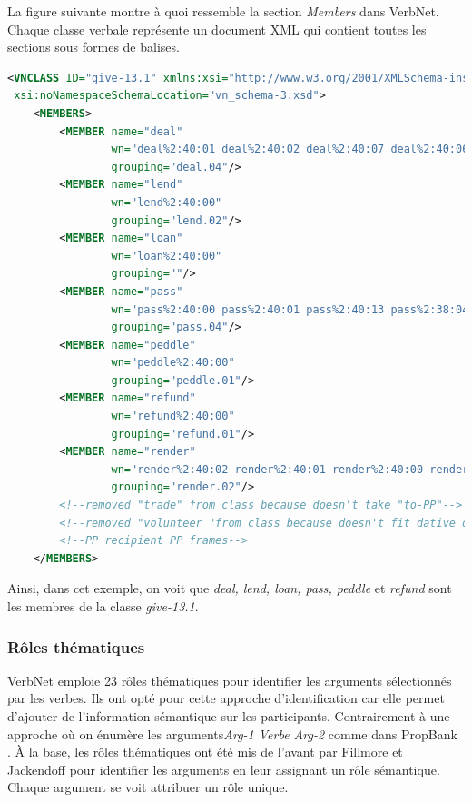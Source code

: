 La figure suivante montre à quoi ressemble la section \emph{Members} dans VerbNet. Chaque classe verbale représente un document XML qui contient toutes les sections sous formes de balises.

\begin{lstlisting}[language=XML, caption = Les membres d'une classe]
<VNCLASS ID="give-13.1" xmlns:xsi="http://www.w3.org/2001/XMLSchema-instance"
 xsi:noNamespaceSchemaLocation="vn_schema-3.xsd">
    <MEMBERS>
        <MEMBER name="deal" 
				wn="deal%2:40:01 deal%2:40:02 deal%2:40:07 deal%2:40:06" 
				grouping="deal.04"/>
        <MEMBER name="lend" 
				wn="lend%2:40:00" 
				grouping="lend.02"/>
        <MEMBER name="loan" 
				wn="loan%2:40:00" 
				grouping=""/>
        <MEMBER name="pass" 
				wn="pass%2:40:00 pass%2:40:01 pass%2:40:13 pass%2:38:04" 
				grouping="pass.04"/>
        <MEMBER name="peddle" 
				wn="peddle%2:40:00" 
				grouping="peddle.01"/>
        <MEMBER name="refund" 
				wn="refund%2:40:00" 
				grouping="refund.01"/>
        <MEMBER name="render" 
				wn="render%2:40:02 render%2:40:01 render%2:40:00 render%2:40:03" 
				grouping="render.02"/>
        <!--removed "trade" from class because doesn't take "to-PP"-->
        <!--removed "volunteer "from class because doesn't fit dative or-->
        <!--PP recipient PP frames-->
    </MEMBERS>
\end{lstlisting}

Ainsi, dans cet exemple, on voit que \emph{deal, lend, loan, pass, peddle} et \emph{refund} sont les membres de la classe \emph{give-13.1}.

\subsubsection{Rôles thématiques}

VerbNet emploie 23 rôles thématiques pour identifier les arguments sélectionnés par les verbes. Ils  ont opté pour cette approche d'identification car elle permet d'ajouter de l'information sémantique sur les participants. Contrairement à une approche où on énumère les arguments\emph{Arg-1 Verbe Arg-2} comme dans PropBank \citep{PalmerPropositionBankAnnotated2005}. À la base, les rôles thématiques ont été mis de l'avant par Fillmore \citep{fillmore:case} et Jackendoff \citep{Jackendoff1972-JACSII-2} pour identifier les arguments en leur assignant un rôle sémantique. Chaque argument se voit attribuer un rôle unique.

